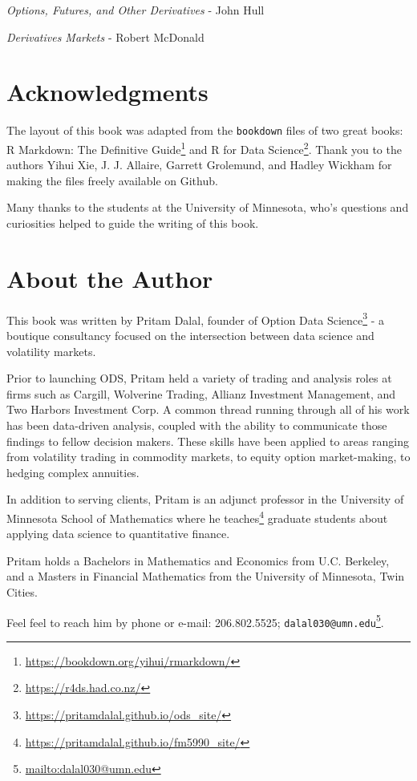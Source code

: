 \documentclass[11pt,]{krantz}
\renewcommand{\href}[2]{#2\footnote{\url{#1}}}
\begin{document}
\emph{Options, Futures, and Other Derivatives} - John Hull

\emph{Derivatives Markets} - Robert McDonald

\section{Acknowledgments}\label{acknowledgments}

The layout of this book was adapted from the \texttt{bookdown} files of two great books: \href{https://bookdown.org/yihui/rmarkdown/}{R Markdown: The Definitive Guide} and \href{https://r4ds.had.co.nz/}{R for Data Science}. Thank you to the authors Yihui Xie, J. J. Allaire, Garrett Grolemund, and Hadley Wickham for making the files freely available on Github.

Many thanks to the students at the University of Minnesota, who's questions and curiosities helped to guide the writing of this book.

\section{About the Author}\label{about-the-author}

This book was written by Pritam Dalal, founder of \href{https://pritamdalal.github.io/ods_site/}{Option Data Science} - a boutique consultancy focused on the intersection between data science and volatility markets.

Prior to launching ODS, Pritam held a variety of trading and analysis roles at firms such as Cargill, Wolverine Trading, Allianz Investment Management, and Two Harbors Investment Corp. A common thread running through all of his work has been data-driven analysis, coupled with the ability to communicate those findings to fellow decision makers. These skills have been applied to areas ranging from volatility trading in commodity markets, to equity option market-making, to hedging complex annuities.

In addition to serving clients, Pritam is an adjunct professor in the University of Minnesota School of Mathematics where he \href{https://pritamdalal.github.io/fm5990_site/}{teaches} graduate students about applying data science to quantitative finance.

Pritam holds a Bachelors in Mathematics and Economics from U.C. Berkeley, and a Masters in Financial Mathematics from the University of Minnesota, Twin Cities.

Feel feel to reach him by phone or e-mail: 206.802.5525; \href{mailto:dalal030@umn.edu}{\nolinkurl{dalal030@umn.edu}}.
\end{document}

